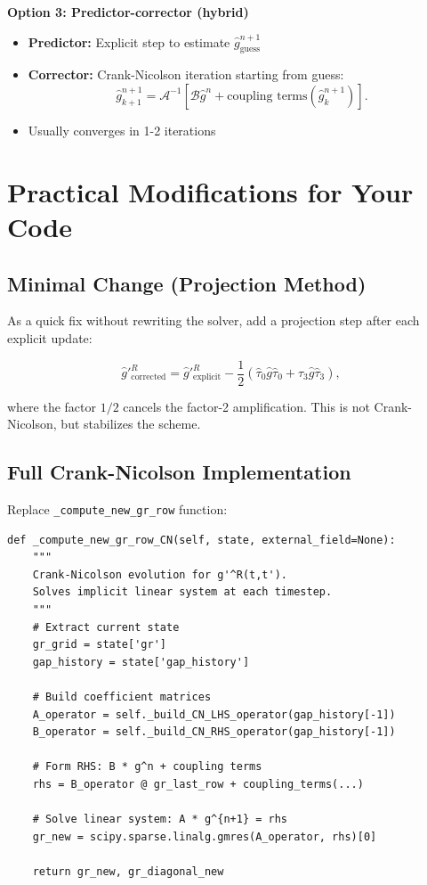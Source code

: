 \documentclass[11pt]{article}
\begin{document}
\textbf{Option 3: Predictor-corrector (hybrid)}
\begin{itemize}
\item \textbf{Predictor:} Explicit step to estimate $\hat{g}^{n+1}_{\text{guess}}$
\item \textbf{Corrector:} Crank-Nicolson iteration starting from guess:
\begin{equation}
\hat{g}^{n+1}_{k+1} = \mathcal{A}^{-1} \left[ \mathcal{B} \hat{g}^n + \text{coupling terms}(\hat{g}^{n+1}_k) \right].
\end{equation}
\item Usually converges in 1-2 iterations
\end{itemize}

\section{Practical Modifications for Your Code}

\subsection{Minimal Change (Projection Method)}

As a quick fix without rewriting the solver, add a projection step after each explicit update:

\begin{equation}
\hat{g}'^R_{\text{corrected}} = \hat{g}'^R_{\text{explicit}} - \frac{1}{2} (\hat{\tau}_0 \hat{g} \hat{\tau}_0 + \hat{\tau}_3 \hat{g} \hat{\tau}_3),
\end{equation}

where the factor $1/2$ cancels the factor-2 amplification. This is not Crank-Nicolson, but stabilizes the scheme.

\subsection{Full Crank-Nicolson Implementation}

Replace \texttt{\_compute\_new\_gr\_row} function:

\begin{verbatim}
def _compute_new_gr_row_CN(self, state, external_field=None):
    """
    Crank-Nicolson evolution for g'^R(t,t').
    Solves implicit linear system at each timestep.
    """
    # Extract current state
    gr_grid = state['gr']
    gap_history = state['gap_history']

    # Build coefficient matrices
    A_operator = self._build_CN_LHS_operator(gap_history[-1])
    B_operator = self._build_CN_RHS_operator(gap_history[-1])

    # Form RHS: B * g^n + coupling terms
    rhs = B_operator @ gr_last_row + coupling_terms(...)

    # Solve linear system: A * g^{n+1} = rhs
    gr_new = scipy.sparse.linalg.gmres(A_operator, rhs)[0]

    return gr_new, gr_diagonal_new
\end{verbatim}
\end{document}
